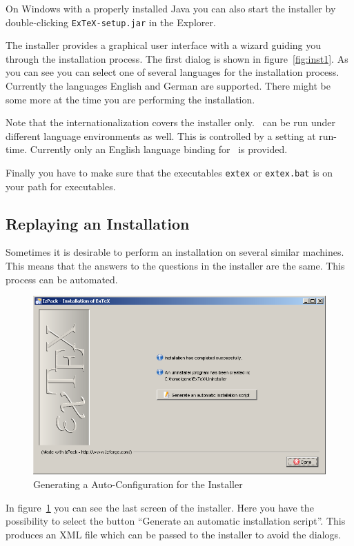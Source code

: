 \documentclass{extex-doc}
\newcommand\Prog[1]{\texttt{#1}\index{#1}}
\begin{document}
On Windows with a properly installed Java
you can also start the installer by double-clicking
\texttt{ExTeX-setup.jar} in the Explorer.

The installer provides a graphical user interface with a wizard
guiding you through the installation process. The first dialog is
shown in figure~\ref{fig:inst1}. As you can see you can select one of
several languages for the installation process. Currently the
languages English and German are supported. There might be some more
at the time you are performing the
installation.

Note that the internationalization covers the installer only. \ExTeX\
can be run under different language environments as well. This is
controlled by a setting at run-time. Currently only an English
language binding for \ExTeX\ is provided.

Finally you have to make sure that the executables \Prog{extex} or
\Prog{extex.bat} is on your path for executables.\index{path}


\subsection{Replaying an Installation}

Sometimes it is desirable to perform an installation on several
similar machines. This means that the answers to the questions in the
installer are the same. This process can be automated.
\begin{figure}[tp]
  \centering
  \includegraphics[width=.8\textwidth]{img/inst8}
  \caption{Generating a Auto-Configuration for the Installer}
  \label{fig:inst8}
\end{figure}

In figure~\ref{fig:inst8} you can see the last screen of the
installer. Here you have the possibility to select the button
``Generate an automatic installation script''. This produces an XML
file which can be passed to the installer to avoid the
dialogs.
\end{document}
